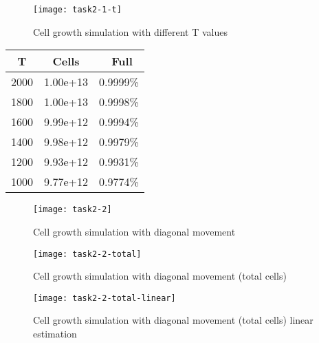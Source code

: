 \clearpage

\begin{figure}[ht]
    \centering
    \texttt{[image: task2-1-t]}
    \caption[Cell growth simulation with different T values]{Cell growth simulation with different T values}
    \label{fig:task2-1-t}
\end{figure}

\begin{center}
\begin{tabular}{c | c c} 
    T & Cells & \ Full \\
    \hline
    2000 & 1.00e+13 & 0.9999\% \\
    1800 & 1.00e+13 & 0.9998\% \\
    1600 & 9.99e+12 & 0.9994\% \\
    1400 & 9.98e+12 & 0.9979\% \\
    1200 & 9.93e+12 & 0.9931\% \\
    1000 & 9.77e+12 & 0.9774\% \\    
\end{tabular}
\end{center}

\clearpage

\begin{figure}[ht]
    \centering
    \texttt{[image: task2-2]}
    \caption[Cell growth simulation with diagonal movement]{Cell growth simulation with diagonal movement}
    \label{fig:task2-2}
\end{figure}

\clearpage

\begin{figure}[ht]
    \centering
    \texttt{[image: task2-2-total]}
    \caption[Cell growth simulation with diagonal movement (total cells)]{Cell growth simulation with diagonal movement (total cells)}
    \label{fig:task2-2-total}
\end{figure}

\begin{figure}[ht]
    \centering
    \texttt{[image: task2-2-total-linear]}
    \caption[Cell growth simulation with diagonal movement (total cells) linear estimation]{Cell growth simulation with diagonal movement (total cells) linear estimation}
    \label{fig:task2-2-total-linear}
\end{figure}
